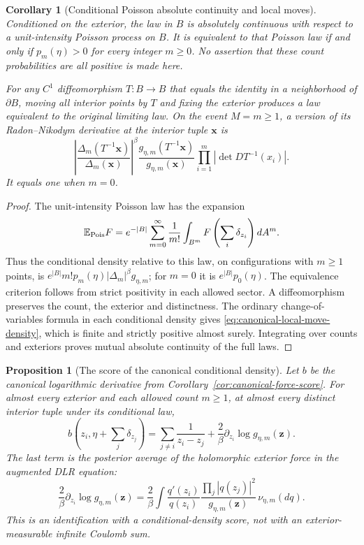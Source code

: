 \documentclass[11pt,a4paper]{article}
\numberwithin{equation}{section}
\newtheorem{proposition}[theorem]{Proposition}
\newtheorem{corollary}[theorem]{Corollary}
\theoremstyle{definition}
\theoremstyle{remark}
\begin{document}
\begin{corollary}[Conditional Poisson absolute continuity and local moves]
\label{cor:canonical-local-quasiinvariance}
Conditioned on the exterior, the law in $B$ is absolutely continuous
with respect to a unit-intensity Poisson process on $B$. It is
equivalent to that Poisson law if and only if
$p_m(\eta)>0$ for every integer $m\ge0$. No assertion that these count
probabilities are all positive is made here.

For any $C^1$ diffeomorphism $T:B\to B$ that equals the identity in a
neighborhood of $\partial B$, moving all interior points by $T$ and
fixing the exterior produces a law equivalent to the original limiting
law. On the event $M=m\ge1$, a version of its Radon--Nikodym derivative
at the interior tuple $\mathbf x$ is
\begin{equation}\label{eq:canonical-local-move-density}
 \left|\frac{\Delta_m(T^{-1}\mathbf x)}{\Delta_m(\mathbf x)}\right|^\beta
 \frac{g_{\eta,m}(T^{-1}\mathbf x)}{g_{\eta,m}(\mathbf x)}
 \prod_{i=1}^m |\det D T^{-1}(x_i)|.
\end{equation}
It equals one when $m=0$.
\end{corollary}

\begin{proof}
The unit-intensity Poisson law has the expansion
\[
 \mathbb E_{\rm Pois}F
       =e^{-|B|}\sum_{m=0}^\infty\frac1{m!}
                         \int_{B^m}F\left(\sum_i\delta_{z_i}\right)dA^m.
\]
Thus the conditional density relative to this law, on configurations
with $m\ge1$ points, is
$e^{|B|}m!p_m(\eta)|\Delta_m|^\beta g_{\eta,m}$; for $m=0$ it is
$e^{|B|}p_0(\eta)$. The equivalence criterion follows from strict
positivity in each allowed sector. A diffeomorphism preserves the
count, the exterior and distinctness. The ordinary change-of-variables
formula in each conditional density gives
\eqref{eq:canonical-local-move-density}, which is finite and strictly
positive almost surely. Integrating over counts and exteriors proves
mutual absolute continuity of the full laws.
\end{proof}

\begin{proposition}[The score of the canonical conditional density]
\label{prop:canonical-quasigibbs-score}
Let $b$ be the canonical logarithmic derivative from
Corollary~\ref{cor:canonical-force-score}. For almost every exterior
and each allowed count $m\ge1$, at almost every distinct interior
tuple under its conditional law,
\begin{equation}\label{eq:canonical-quasigibbs-score}
 b(z_i,\eta+\textstyle\sum_j\delta_{z_j})
   =\sum_{j\ne i}\frac1{z_i-z_j}
          +\frac2\beta\partial_{z_i}\log g_{\eta,m}(\mathbf z).
\end{equation}
The last term is the posterior average of the holomorphic exterior
force in the augmented DLR equation:
\[
 \frac2\beta\partial_{z_i}\log g_{\eta,m}(\mathbf z)
   =\frac2\beta
       \int\frac{q'(z_i)}{q(z_i)}
       \frac{\prod_j|q(z_j)|^2}{g_{\eta,m}(\mathbf z)}
                                                \,\nu_{\eta,m}(dq).
\]
This is an identification with a conditional-density score, not with
an exterior-measurable infinite Coulomb sum.
\end{proposition}
\end{document}
